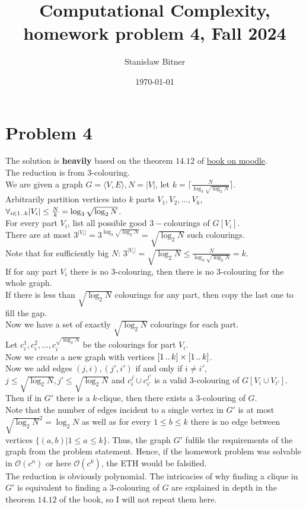 \documentclass[11pt]{article}
\title{Computational Complexity, homework problem 4, Fall 2024}
\author{Stanisław Bitner}
\date{\today}
\newcommand{\dd}{\mathinner{{\ldotp}{\ldotp}}}
\begin{document}
\maketitle

\section*{Problem 4}
The solution is \textbf{heavily} based on the theorem $14.12$ of \href{https://parameterized-algorithms.mimuw.edu.pl/parameterized-algorithms.pdf}{book on moodle}.\\
The reduction is from 3-colouring.\\
We are given a graph $G=\langle V, E \rangle, N=|V|$, let $k = \lceil \frac{N}{\log_3{\sqrt{\log_2{N}}}} \rceil$.\\
Arbitrarily partition vertices into $k$ parts $V_1,V_2,\ldots,V_k$,\\
$\forall_{i \in 1 \dd k} |V_i| \le \frac{N}{k} = \log_3{\sqrt{\log_2{N}}}$.\\
For every part $V_i$, list all possible good $3-$colourings of $G[V_i]$.\\
There are at most $3^{|V_i|} = 3^{\log_3{\sqrt{\log_2{N}}}} = \sqrt{\log_2{N}}$ such colourings.\\
Note that for sufficiently big $N$: $3^{|V_i|} = \sqrt{\log_2{N}} \le \frac{N}{\log_3{\sqrt{\log_2{N}}}} = k $.\\
If for any part $V_i$ there is no $3$-colouring, then there is no $3$-colouring for the whole graph.\\
If there is less than $\sqrt{\log_2{N}}$ colourings for any part, then copy the last one to fill the gap.\\
Now we have a set of exactly $\sqrt{\log_2{N}}$ colourings for each part.\\
Let $c_i^1, c_i^2, \ldots, c_i^{\sqrt{\log_2{N}}}$ be the colourings for part $V_i$.\\
Now we create a new graph with vertices $[1 \dd k] \times [1 \dd k]$.\\
Now we add edges $(j,i),(j',i')$ if and only if $i \neq i'$,\\
$j \le \sqrt{\log_2{N}}, j' \le \sqrt{\log_2{N}}$ and $c_i^j \cup c_{i'}^{j'}$ is a
valid $3$-colouring of $G[V_i \cup V_{i'}]$.\\
Then if in $G'$ there is a $k$-clique, then there exists a $3$-colouring of $G$.\\
Note that the number of edges incident to a single vertex in $G'$ is at most
$\sqrt{\log_2{N}}^2 = \log_2{N}$ as well as for every $1\le b \le k$ there is no
edge between vertices $\{ (a,b) \big| 1 \le a \le k \}$. Thus, the graph $G'$
fulfils the requirements of the graph from the problem statement. Hence, if the
homework problem was solvable in $\mathcal{O}(c^n)$ or here $\mathcal{O}(c^k)$,
the ETH would be falsified.\\
The reduction is obviously polynomial. 
The intricacies of why finding a clique in $G'$ is equivalent to finding a
$3$-colouring of $G$ are explained in depth in the theorem $14.12$ of the book,
so I will not repeat them here.
\end{document}
